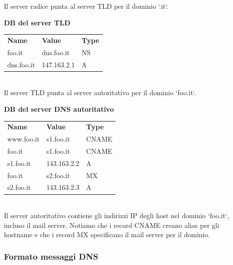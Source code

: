 Il server radice punta al server TLD per il dominio `.it`.

\bigskip
\textbf{DB del server TLD} \newline
\begin{tabular}{lll}
\textbf{Name} & \textbf{Value}     & \textbf{Type} \\
foo.it        & dns.foo.it         & NS            \\
dns.foo.it    & 147.163.2.1        & A             
\end{tabular} \\ 

Il server TLD punta al server autoritativo per il dominio `foo.it`.

\bigskip

\textbf{DB del server DNS autoritativo} \newline
\begin{tabular}{lll}
\textbf{Name} & \textbf{Value}     & \textbf{Type}  \\
www.foo.it    & s1.foo.it          & CNAME          \\
foo.it        & s1.foo.it          & CNAME          \\
s1.foo.it     & 143.163.2.2        & A              \\
foo.it        & s2.foo.it          & MX             \\
s2.foo.it     & 143.163.2.3        & A              
\end{tabular} \\ 

Il server autoritativo contiene gli indirizzi IP degli host nel dominio `foo.it`, incluso il mail server. Notiamo che i record CNAME creano alias per gli hostname e che i record MX specificano il mail server per il dominio.

\subsubsection{Formato messaggi DNS}

